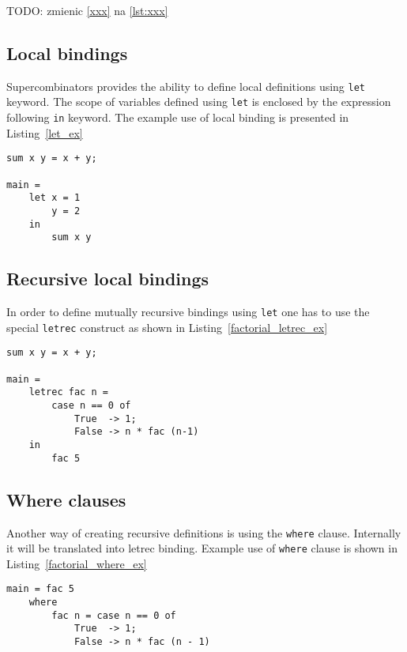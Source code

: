 \documentclass[12pt,a4paper]{report}
\begin{document}
TODO: zmienic \ref{xxx} na \ref{lst:xxx}

\subsection{Local bindings}
Supercombinators provides the ability to define local definitions using
\texttt{let} keyword. The scope of variables defined using \texttt{let} is
enclosed by the expression following \texttt{in} keyword. The example use of
local binding is presented in Listing~\ref{let_ex}

\hspace*{-1.5in}
\begin{lstlisting}[style=haskell,label=let_ex,caption={Local \texttt{let} binding.}]
sum x y = x + y;

main =
    let x = 1
        y = 2
    in
        sum x y
\end{lstlisting}

\subsection{Recursive local bindings}
In order to define mutually recursive bindings using \texttt{let} one has to use the
special \texttt{letrec} construct as shown in Listing~\ref{factorial_letrec_ex}

\hspace*{-1.5in}
\begin{lstlisting}[style=haskell,label=factorial_letrec_ex,caption={Factorial function using \texttt{letrec}.}]
sum x y = x + y;

main =
    letrec fac n =
        case n == 0 of
            True  -> 1;
            False -> n * fac (n-1)
    in
        fac 5
\end{lstlisting}

\subsection{Where clauses}
Another way of creating recursive definitions is using the \texttt{where}
clause. Internally it will be translated into letrec binding. Example use of
\texttt{where} clause is shown in Listing~\ref{factorial_where_ex}

\hspace*{-1.5in}
\begin{lstlisting}[style=haskell,label=factorial_where_ex,caption={Factorial function using \texttt{where}.}]
main = fac 5
    where
        fac n = case n == 0 of
            True  -> 1;
            False -> n * fac (n - 1)
\end{lstlisting}
\end{document}
